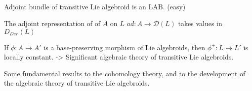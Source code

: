 \subsection{}

Adjoint bundle of transitive Lie algebroid is an LAB. (easy)

\quad The adjoint representation of of $A$ on $L$ $ad:A \to \mathcal D(L)$ takes values in $D_{Der}(L)$

If $\phi: A \to A'$  is a base-preserving morphism of Lie algebroids, then $\phi^+:L \to L'$ is locally constant. -> Significant algebraic theory of transitive Lie algebroids.

Some fundamental results to the cohomology theory, and to the development of the algebraic theory of transitive Lie algebroids.